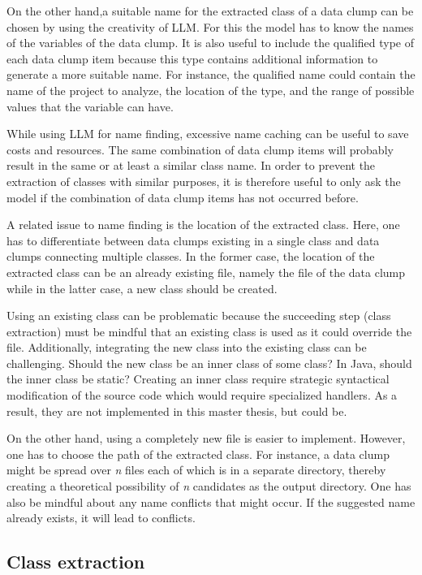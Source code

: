 On the other hand,a suitable name for the extracted class of a data clump can be chosen by using the creativity of \acs{LLM}.  For this the model has to know the names of the variables of the data clump. It is also useful to include the qualified type of each data clump item because this type contains additional information to generate a more suitable name. For instance, the qualified name could contain the name of the project to analyze, the location of the type, and the range of possible values that the variable can have.

While using \acs{LLM} for name finding, excessive name caching can be useful to save costs and resources. The same combination of data clump items will probably result in the same or at least a similar class name. In order to prevent the extraction of classes with similar purposes, it is therefore useful to only ask the model if the combination of data clump items has not occurred before. 

A related issue to name finding is the location of the extracted class. Here, one has to differentiate  between data clumps existing in a single class and data clumps connecting multiple classes. In the former case, the location of the extracted class can be an already existing file, namely the file of the data clump  while in the latter case, a new class should be created.

Using an existing class can be problematic because the succeeding step (class extraction) must be mindful that an existing class is used as it could override the file. Additionally, integrating the new class into the existing class can be challenging. Should the new class be an inner class of some class? In Java, should the inner class be static?  Creating an inner class require strategic syntactical modification of the source code which would require specialized handlers. As a result, they are not implemented in this master thesis, but could be. 

On the other hand, using a completely new file is easier to implement. However, one has to choose the path of the extracted class. For instance, a data clump might be spread over \textit{n} files each of which is in a separate directory, thereby creating a theoretical possibility of \textit{n} candidates as the output directory. 
One has also be mindful about any name conflicts that might occur. If the suggested name already exists, it will lead to conflicts.


\subsection{Class extraction}

